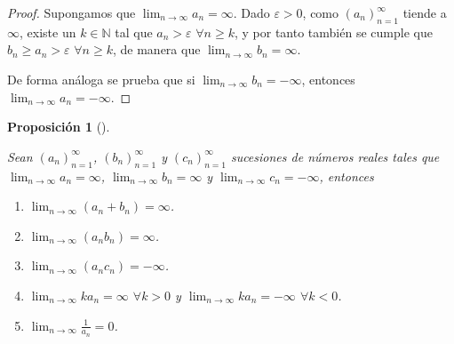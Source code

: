 \documentclass[
  a4paper,
]{scrreport}
\providecommand{\tightlist}{%
  \setlength{\itemsep}{0pt}\setlength{\parskip}{0pt}}\usepackage{longtable,booktabs,array}
\theoremstyle{definition}
\theoremstyle{plain}
\theoremstyle{plain}
\newtheorem{proposition}{Proposición}[chapter]
\theoremstyle{definition}
\theoremstyle{definition}
\theoremstyle{plain}
\theoremstyle{remark}
\begin{document}
\begin{tcolorbox}[enhanced jigsaw, breakable, title=\textcolor{quarto-callout-note-color}{\faInfo}\hspace{0.5em}{Demostración}, toprule=.15mm, coltitle=black, arc=.35mm, rightrule=.15mm, colframe=quarto-callout-note-color-frame, colbacktitle=quarto-callout-note-color!10!white, toptitle=1mm, titlerule=0mm, leftrule=.75mm, opacityback=0, colback=white, bottomrule=.15mm, bottomtitle=1mm, left=2mm, opacitybacktitle=0.6]

\begin{proof}

Supongamos que \(\lim_{n\to\infty}a_n=\infty\). Dado \(\varepsilon>0\),
como \((a_n)_{n=1}^\infty\) tiende a \(\infty\), existe un
\(k\in\mathbb{N}\) tal que \(a_n>\varepsilon\) \(\forall n\geq k\), y
por tanto también se cumple que \(b_n\geq a_n>\varepsilon\)
\(\forall n\geq k\), de manera que \(\lim_{n\to\infty}b_n=\infty\).

De forma análoga se prueba que si \(\lim_{n\to\infty}b_n=-\infty\),
entonces \(\lim_{n\to\infty}a_n=-\infty\).

\end{proof}

\end{tcolorbox}

\begin{proposition}[]\protect\hypertarget{prp-algebra-sucesiones-propiamentes-divergentes}{}\label{prp-algebra-sucesiones-propiamentes-divergentes}

Sean \((a_n)_{n=1}^\infty\), \((b_n)_{n=1}^\infty\) y
\((c_n)_{n=1}^\infty\) sucesiones de números reales tales que
\(\lim_{n\to\infty}a_n=\infty\), \(\lim_{n\to\infty}b_n=\infty\) y
\(\lim_{n\to\infty}c_n=-\infty\), entonces

\begin{enumerate}
\def\labelenumi{\alph{enumi}.}
\tightlist
\item
  \(\lim_{n\to\infty}(a_n+b_n)=\infty\).
\item
  \(\lim_{n\to\infty}(a_nb_n)=\infty\).
\item
  \(\lim_{n\to\infty}(a_nc_n)=-\infty\).
\item
  \(\lim_{n\to\infty}ka_n=\infty\) \(\forall k>0\) y
  \(\lim_{n\to\infty}ka_n=-\infty\) \(\forall k<0\).
\item
  \(\lim_{n\to\infty}\frac{1}{a_n}=0\).
\end{enumerate}

\end{proposition}
\end{document}
